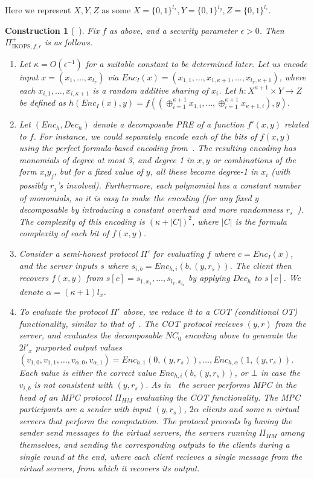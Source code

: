 \documentclass[a4paper]{article}
\newtheorem{construction}{Construction}
\begin{document}
Here we represent  $X,Y,Z$ as some $X=\{0,1\}^{l_x},Y=\{0,1\}^{l_y},Z=\{0,1\}^{l_z}$. 
\begin{construction}[~\cite{IKOPS11}]\label{con-ikops+} 
	Fix $f$ as above, and a security parameter $\epsilon>0$. 
	Then $\Pi^+_{\text{IKOPS},f,\epsilon}$ is as follows.
	\begin{enumerate}	
	\item Let $\kappa=O(\epsilon^{-1})$ for a suitable constant to be determined later.
	 Let us encode input $x=(x_1,\ldots,x_{l_x})$ via
	$Enc_I(x)=(x_{1,1},\ldots,x_{1,\kappa+1},\ldots,x_{l_x,\kappa+1})$, where each $x_{i,1},\ldots,x_{i,\kappa+1}$ is a random additive sharing of $x_i$. Let $h:X^{\kappa+1}\times Y\rightarrow Z$ be defined as $h(Enc_I(x),y)=f((\oplus^{\kappa+1}_{i=1}x_{1,i},\ldots,\oplus^{\kappa+1}_{i=1}x_{\kappa+1,i}),y)$. 
	\item Let $(Enc_h,Dec_h)$ denote a decomposabe PRE of a function $f'(x,y)$ related to $f$. For instance, we could separately encode each of the bits of $f(x,y)$ using the perfect formula-based encoding from~\cite{IK02}.
	The resulting encoding has monomials of degree at most 3, and degree 1 in $x,y$ or combinations of the form $x_iy_j$, but for a fixed value of $y$, all these become degree-1 in $x_i$ (with possibly $r_j$'s involved). Furthermore, each polynomial has a constant number of monomials, so it is easy to make the encoding (for any fixed $y$ decomposable by introducing a constant overhead and more randomness $r_s$~\cite{}). The complexity of this encoding is $(\kappa+|C|)^2$, where $|C|$ is the formula complexity of each bit of $f(x,y)$.
	\item Consider a semi-honest protocol $\Pi'$ for evaluating $f$ where $c=Enc_I(x)$, and the server inputs $s$ where $s_{i,b}=Enc_{h,i}(b,(y,r_s))$. The client then recovers $f(x,y)$ from
	$s[c]=s_{1,x_1},\ldots,s_{l_x,x_{l_x}}$ by applying $Dec_h$ to $s[c]$.
	We denote $\alpha=(\kappa+1)l_x$.%
	\item To evaluate the protocol $\Pi'$ above, we reduce it to a COT (conditional OT) functionality, similar to that of~\cite{IKOPS11}. The COT protocol recieves $(y,r)$ from the server, and evaluates the decomposable $NC_0$ encoding above to generate the $2l'_x$ purported output values 
	$(v_{1,0},v_{1,1},\ldots,v_{\alpha,0},v_{\alpha,1})=Enc_{h,1}(0,(y,r_s)),\ldots,Enc_{h,\alpha}(1,(y,r_s))$.   
	Each value is either the correct value $Enc_{h,i}(b,(y,r_s))$, or $\bot$ in case the $v_{i,b}$ is not consistent with $(y,r_s)$.
	As in~\cite{IKOPS11} the server performs MPC in the head 
	of an MPC protocol $\Pi_{HM}$ evaluating the COT functionality.
	The MPC participants are a sender with input $(y,r_s)$, $2\alpha$ clients and some $n$ virtual servers that perform the computation. The protocol proceeds by having the sender send messages to the virtual servers, the servers running $\Pi_{HM}$ among themselves, and sending the corresponding outputs to the clients during a single round at the end, where each client recieves a single message from the virtual servers, from which it recovers its output.
	

\end{enumerate}
\end{construction}
\end{document}
